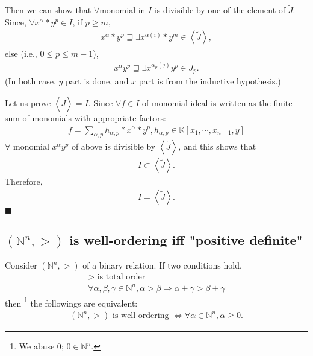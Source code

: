 \documentclass[11pt]{book}
\begin{document}
Then we can show that $\forall $monomial in $I$ is divisible by one of the element of $\tilde{J}$.
Since, $\forall x^\alpha * y^p \in I$, if $p \geq m$,
\begin{eqnarray}
x^\alpha * y^p  \sqsupseteq \exists x^{\alpha(i)} * y^m \in \left< \tilde{J} \right>,
\end{eqnarray}
else (i.e., $0 \leq p \leq m-1$),
\begin{eqnarray}
x^\alpha y^p  \sqsupseteq \exists x^{\alpha_p(j)} y^p \in J_p.
\end{eqnarray}
(In both case, $y$ part is done, and $x$ part is from the inductive hypothesis.)

Let us prove $\left< \tilde{J} \right> = I$.
Since $\forall f \in I$ of monomial ideal is written as the finite sum of monomials with appropriate factors:
\begin{eqnarray}
f = \sum_{\alpha,p} h_{\alpha,p} * x^\alpha * y^p, h_{\alpha,p} \in \mathbb{K}[x_1, \cdots, x_{n-1},y]
\end{eqnarray}
$\forall$ monomial $x^\alpha y^p$ of above is divisible by $\left< \tilde{J} \right>$, and this shows that
\begin{eqnarray}
I \subset \left< \tilde{J} \right>.
\end{eqnarray}
Therefore,
\begin{eqnarray}
I = \left< \tilde{J} \right>.
\end{eqnarray}
$\blacksquare$

\subsection{$(\mathbb{N}^n, >)$ is well-ordering iff "positive definite"}
\label{WellOrderingIffPD}
Consider $(\mathbb{N}^n, >)$ of a binary relation.
If two conditions hold, 
\begin{eqnarray}
> \text{ is total order} \\
\forall \alpha,\beta,\gamma \in \mathbb{N}^n, \alpha > \beta \Rightarrow \alpha + \gamma > \beta + \gamma
\end{eqnarray}
then \footnote{We abuse 0; $0 \in \mathbb{N}^n$.} the followings are equivalent:
\begin{eqnarray}
\label{simpleWOProperty}
(\mathbb{N}^n, >) \text{ is well-ordering } \Leftrightarrow \forall \alpha \in \mathbb{N}^n, \alpha \geq 0.
\end{eqnarray}
\end{document}
